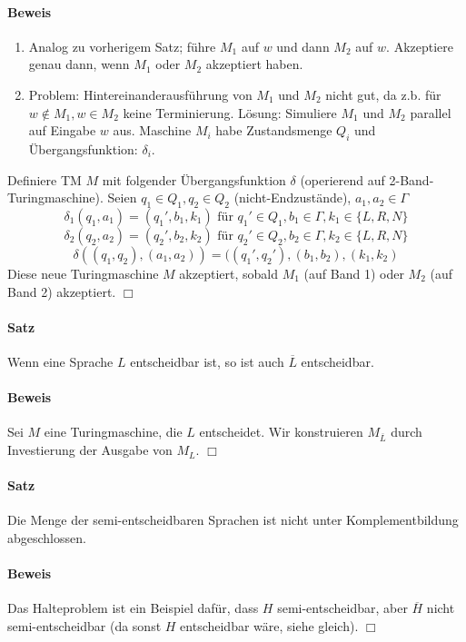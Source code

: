 \paragraph*{Beweis}
\begin{enumerate}
	\item Analog zu vorherigem Satz; führe $M_1$ auf $w$ und dann $M_2$ auf $w$. Akzeptiere genau dann, wenn $M_1$ oder $M_2$ akzeptiert haben.
	\item Problem: Hintereinanderausführung von $M_1$ und $M_2$ nicht gut, da z.b. für $w\not\in M_1,w\in M_2$ keine Terminierung. Lösung: Simuliere $M_1$ und $M_2$ parallel auf Eingabe $w$ aus. Maschine $M_i$ habe Zustandsmenge $Q_i$ und Übergangsfunktion: $\delta_i$.
\end{enumerate}
Definiere TM $M$ mit folgender Übergangsfunktion $\delta$ (operierend auf 2-Band-Turingmaschine). Seien $q_1 \in Q_1, q_2 \in Q_2$ (nicht-Endzustände), $a_1,a_2 \in \Gamma$
$$ \delta_1(q_1,a_1)=(q_1',b_1,k_1) \text{ für } q_1' \in Q_1,b_1 \in \Gamma,k_1\in\{L,R,N\} $$
$$ \delta_2(q_2,a_2)=(q_2',b_2,k_2) \text{ für } q_2' \in Q_2,b_2\in\Gamma,k_2\in\{L,R,N\} $$
$$ \delta((q_1,q_2),(a_1,a_2))=((q_1',q_2'),(b_1,b_2),(k_1,k_2) $$ %
Diese neue Turingmaschine $M$ akzeptiert, sobald $M_1$ (auf Band 1) oder $M_2$ (auf Band 2) akzeptiert. $\Box$

\paragraph*{Satz} Wenn eine Sprache $L$ entscheidbar ist, so ist auch $\overline{L}$ entscheidbar.

\paragraph*{Beweis} Sei $M$ eine Turingmaschine, die $L$ entscheidet. Wir konstruieren $M_{\overline{L}}$ durch Investierung der Ausgabe von $M_L$. $\Box$

\paragraph*{Satz} Die Menge der semi-entscheidbaren Sprachen ist nicht unter Komplementbildung abgeschlossen.

\paragraph*{Beweis} Das Halteproblem ist ein Beispiel dafür, dass $H$ semi-entscheidbar, aber $\overline{H}$ nicht semi-entscheidbar (da sonst $H$ entscheidbar wäre, siehe gleich). $\Box$

